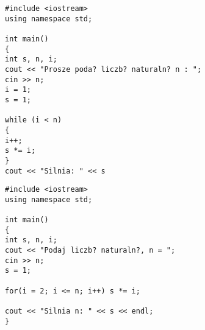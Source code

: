 \documentclass[a4paper,11pt]{article}
\begin{document}
\begin{lstlisting}[caption=Silnia, captionpos=b,
label=src:passive2, firstnumber=12,frame=single]
#include <iostream>
using namespace std;

int main()
{
int s, n, i;
cout << "Prosze poda? liczb? naturaln? n : ";
cin >> n;
i = 1;
s = 1;

while (i < n)
{
i++;
s *= i;
}
cout << "Silnia: " << s
\end{lstlisting}

\begin{lstlisting}[caption=Silnia for, captionpos=t,
label=src:passive3, frame=tbLR]
#include <iostream>
using namespace std;

int main()
{
int s, n, i;  
cout << "Podaj liczb? naturaln?, n = ";
cin >> n;
s = 1;  

for(i = 2; i <= n; i++) s *= i;  

cout << "Silnia n: " << s << endl;
}
\end{lstlisting}
\end{document}
